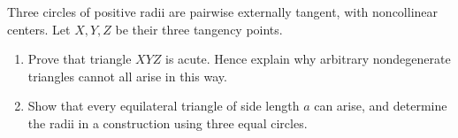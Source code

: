Three circles of positive radii are pairwise externally tangent, with noncollinear centers. Let $X,Y,Z$ be their three tangency points.
\begin{enumerate}
\item Prove that triangle $XYZ$ is acute. Hence explain why arbitrary nondegenerate triangles cannot all arise in this way.
\item Show that every equilateral triangle of side length $a$ can arise, and determine the radii in a construction using three equal circles.
\end{enumerate}
